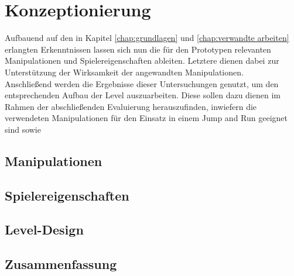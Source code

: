 \chapter{Konzeptionierung}
\label{chap:konzeptionierung}

Aufbauend auf den in Kapitel \ref{chap:grundlagen} und \ref{chap:verwandte arbeiten} erlangten Erkenntnissen lassen sich nun die für den Prototypen relevanten Manipulationen und Spielereigenschaften ableiten. Letztere dienen dabei zur Unterstützung der Wirksamkeit der angewandten Manipulationen.\\
Anschließend werden die Ergebnisse dieser Untersuchungen genutzt, um den entsprechenden Aufbau der Level auszuarbeiten. Diese sollen dazu dienen im Rahmen der abschließenden Evaluierung herauszufinden, inwiefern die verwendeten Manipulationen für den Einsatz in einem Jump and Run geeignet sind sowie 

\section{Manipulationen}
\label{sec:konzept manipulationen}

\section{Spielereigenschaften}
\label{sec:konzept spielereigenschaften}

\section{Level-Design}
\label{sec:level design}

\section{Zusammenfassung}
\label{sec:zusammenfassung konzeption}

